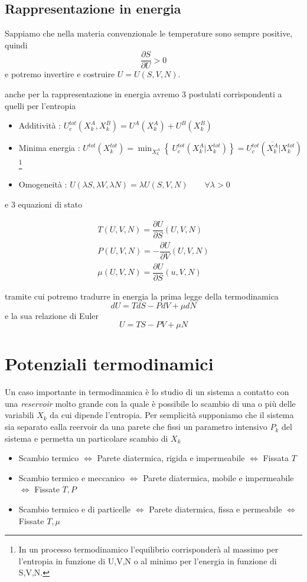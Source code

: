 \documentclass[11pt,a4paper,twoside]{book}
\numberwithin{equation}{section} %
\begin{document}
\subsection{Rappresentazione in energia}

Sappiamo che nella materia convenzionale le temperature sono sempre positive, quindi
\[
\dfrac{\partial S}{\partial U} >0
\]
e potremo invertire e costruire $U=U(S,V,N)$.

anche per la rappresentazione in energia avremo 3 postulati corrispondenti a quelli per l'entropia
\begin{itemize}
\item Additività : $U_c^{tot}(X_k^A,X_k^B)=U^A(X_k^A)+U^B(X_k^B)$
\item Minima energia : $ U^{tot}\left(X_k^{tot}\right)=\min_{X_k^A} \left\{ \> U_c^{tot}\left(X_k^A|X_k^{tot}\right) \right\} = U_c^{tot}\left(\overline{X_k^A}|X_k^{tot}\right)$\footnote{In un processo termodinamico l'equilibrio corrisponderà al massimo per l'entropia in funzione di U,V,N o al minimo per l'energia in funzione di S,V,N. }
\item Omogeneità : $U(\lambda S,\lambda V, \lambda N) = \lambda U(S,V,N) \qquad \forall \lambda > 0$
\end{itemize}
e $3$ equazioni di stato

\begin{align*}
T(U,V,N)=\dfrac{\partial U}{\partial S}(U,V,N)\\
P(U,V,N)=-\dfrac{\partial U}{\partial V}(U,V,N)\\
\mu(U,V,N)=\dfrac{\partial U}{\partial S}(u,V,N)
\end{align*}

tramite cui potremo tradurre in energia la prima legge della termodinamica 
\begin{equation}
dU=TdS-PdV+\mu dN
\end{equation}
e la sua relazione di Euler
\[
U=TS-PV+\mu N
\]



\section{Potenziali termodinamici}


Un caso importante in termodinamica è lo studio di un sistema a contatto con una \textit{reservoir} molto grande con la quale è possibile lo scambio di una o più delle variabili $X_k$ da cui dipende l'entropia. Per semplicità supponiamo che il sistema sia separato ealla reervoir da una parete che fissi un parametro intensivo $P_k$ del sistema e permetta un particolare scambio di $X_k$
\begin{itemize}[label=$\cdot$]
\item Scambio termico $\iff$ Parete diatermica, rigida e impermeabile $\iff$ Fissata $T$
\item Scambio termico e meccanico $\iff$ Parete diatermica, mobile e impermeabile $\iff$ Fissate $T,P$
\item Scambio termico e di particelle $\iff$ Parete diatermica, fissa e permeabile $\iff$ Fissate $T,\mu$
\end{itemize}
\end{document}
